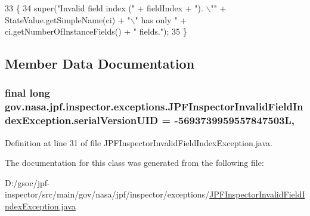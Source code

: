\begin{DoxyCode}
33                                                                                \{
34     super(\textcolor{stringliteral}{"Invalid field index ("} + fieldIndex + \textcolor{stringliteral}{"). \(\backslash\)""} + StateValue.getSimpleName(ci) + \textcolor{stringliteral}{"\(\backslash\)" has only "} + 
      ci.getNumberOfInstanceFields() + \textcolor{stringliteral}{" fields."});
35   \}
\end{DoxyCode}


\subsection{Member Data Documentation}
\subsubsection[{\texorpdfstring{serial\+Version\+U\+ID}{serialVersionUID}}]{\setlength{\rightskip}{0pt plus 5cm}final long gov.\+nasa.\+jpf.\+inspector.\+exceptions.\+J\+P\+F\+Inspector\+Invalid\+Field\+Index\+Exception.\+serial\+Version\+U\+ID = -\/5693739959557847503L\hspace{0.3cm}{\ttfamily [static]}, {\ttfamily [private]}}\hypertarget{classgov_1_1nasa_1_1jpf_1_1inspector_1_1exceptions_1_1_j_p_f_inspector_invalid_field_index_exception_a3ef456967be4a4b894365e4ac5472698}{}\label{classgov_1_1nasa_1_1jpf_1_1inspector_1_1exceptions_1_1_j_p_f_inspector_invalid_field_index_exception_a3ef456967be4a4b894365e4ac5472698}


Definition at line 31 of file J\+P\+F\+Inspector\+Invalid\+Field\+Index\+Exception.\+java.



The documentation for this class was generated from the following file\+:\begin{DoxyCompactItemize}
\item 
D\+:/gsoc/jpf-\/inspector/src/main/gov/nasa/jpf/inspector/exceptions/\hyperlink{_j_p_f_inspector_invalid_field_index_exception_8java}{J\+P\+F\+Inspector\+Invalid\+Field\+Index\+Exception.\+java}\end{DoxyCompactItemize}
